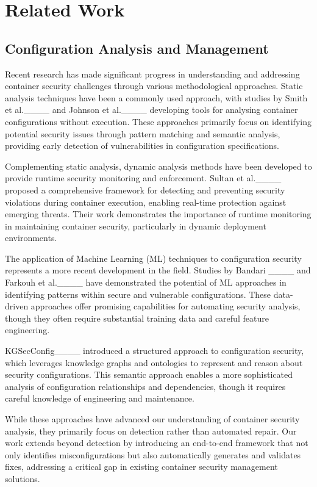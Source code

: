\section{Related Work}
\subsection{Configuration Analysis and Management}
Recent research has made significant progress in understanding and addressing container security challenges through various methodological approaches. Static analysis techniques have been a commonly used approach, with studies by Smith et al.____ and Johnson et al.____ developing tools for analysing container configurations without execution. These approaches primarily focus on identifying potential security issues through pattern matching and semantic analysis, providing early detection of vulnerabilities in configuration specifications.

Complementing static analysis, dynamic analysis methods have been developed to provide runtime security monitoring and enforcement. Sultan et al.____ proposed a comprehensive framework for detecting and preventing security violations during container execution, enabling real-time protection against emerging threats. Their work demonstrates the importance of runtime monitoring in maintaining container security, particularly in dynamic deployment environments.

The application of Machine Learning (ML) techniques to configuration security represents a more recent development in the field. Studies by Bandari ____ and Farkouh et al.____ have demonstrated the potential of ML approaches in identifying patterns within secure and vulnerable configurations. These data-driven approaches offer promising capabilities for automating security analysis, though they often require substantial training data and careful feature engineering.

KGSecConfig____ introduced a structured approach to configuration security, which leverages knowledge graphs and ontologies to represent and reason about security configurations. This semantic approach enables a more sophisticated analysis of configuration relationships and dependencies, though it requires careful knowledge of engineering and maintenance.

While these approaches have advanced our understanding of container security analysis, they primarily focus on detection rather than automated repair. Our work extends beyond detection by introducing an end-to-end framework that not only identifies misconfigurations but also automatically generates and validates fixes, addressing a critical gap in existing container security management solutions.

